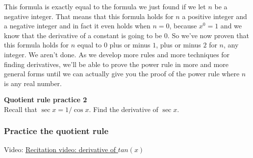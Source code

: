 \documentclass[pdftex, brazil, 12pt, twoside]{article}
\begin{document}
\begin{figure}[H]
  \begin{center}
  \end{center}
\end{figure}

This formula is exactly equal to the formula we just found if we
let $n$ be a negative integer.
That means that this formula holds for $n$ a positive integer
and a negative integer and in fact
it even holds when $n = 0$, because $x^0 = 1$
and we know that the derivative of a constant is going to be $0$.
So we've now proven that this formula holds for $n$ equal to 0
plus or minus $1$, plus or minus $2$ for $n$, any integer.
We aren't done.
As we develop more rules and more techniques
for finding derivatives, we'll be
able to prove the power rule in more and more general forms
until we can actually give you the proof of the power rule
where $n$ is any real number.

\begin{exercise}
  \textbf{Quotient rule practice 2}\\%
  Recall that $\sec{x} = 1/\cos{x}$. Find the derivative of $\sec{x}$.
\end{exercise}

\subsubsection{Practice the quotient rule}
\label{u2-quotient-rule-practice}

Video: \href{https://www.youtube.com/watch?v=wq3jF3COTQU}{Recitation video: derivative of $tan(x)$}
\end{document}
